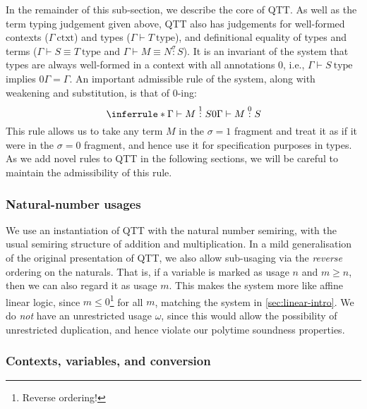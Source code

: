 \documentclass[acmsmall,screen]{acmart}
\newcommand{\istype}{\mathrm{type}}
\newcommand{\isctxt}{\mathrm{ctxt}}
\begin{document}
In the remainder of this sub-section, we describe the core of QTT. As
well as the term typing judgement given above, QTT also has judgements
for well-formed contexts ($\Gamma~\isctxt$) and types
($\Gamma \vdash T~\istype$), and definitional equality of types and
terms ($\Gamma \vdash S \equiv T~\istype$ and
$\Gamma \vdash M \equiv N \stackrel\sigma: S$). It is an invariant of
the system that types are always well-formed in a context with all
annotations $0$, i.e., $\Gamma \vdash S~\istype$ implies
$0\Gamma = \Gamma$. An important admissible rule of the system, along
with weakening and substitution, is that of $0$-ing:
\begin{displaymath}
  \inferrule*
  {\Gamma \vdash M \stackrel1: S}
  {0\Gamma \vdash M \stackrel0: S}
\end{displaymath}
This rule allows us to take any term $M$ in the $\sigma = 1$ fragment
and treat it as if it were in the $\sigma = 0$ fragment, and hence use
it for specification purposes in types. As we add novel rules to QTT
in the following sections, we will be careful to maintain the
admissibility of this rule.

\subsubsection{Natural-number usages}

We use an instantiation of QTT with the natural number semiring, with
the usual semiring structure of addition and multiplication. In a mild
generalisation of the original presentation of QTT, we also allow
sub-usaging via the \emph{reverse} ordering on the naturals. That is,
if a variable is marked as usage $n$ and $m \geq n$, then we can also
regard it as usage $m$. This makes the system more like affine linear
logic, since $m \leq 0$\footnote{Reverse ordering!} for all $m$,
matching the system in \autoref{sec:linear-intro}. We do \emph{not}
have an unrestricted usage $\omega$, since this would allow the
possibility of unrestricted duplication, and hence violate our
polytime soundness properties.

\subsubsection{Contexts, variables, and conversion}
\end{document}
